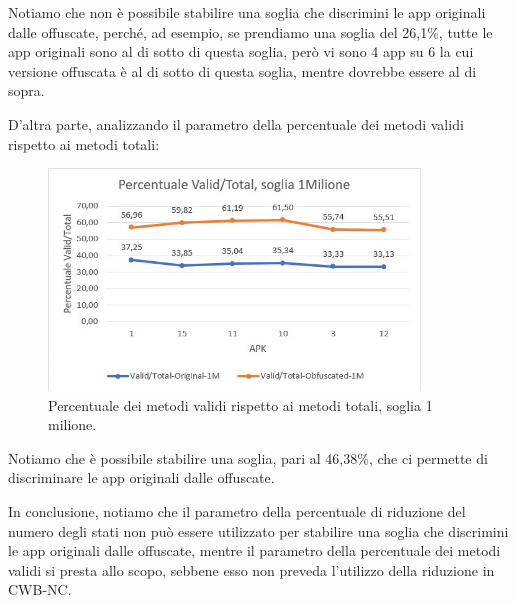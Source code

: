 Notiamo che non è possibile stabilire una soglia che discrimini le app originali dalle offuscate, perché, ad esempio, se prendiamo una soglia del 26,1\%, tutte le app originali sono al di sotto di questa soglia, però vi sono 4 app su 6 la cui versione offuscata è al di sotto di questa soglia, mentre dovrebbe essere al di sopra.

D'altra parte, analizzando il parametro della percentuale dei metodi validi rispetto ai metodi totali:

\begin{figure}[H]
\centering
\includegraphics[width=0.88\textwidth]{img/risultati/metodi_1M.jpg}
\caption{Percentuale dei metodi validi rispetto ai metodi totali, soglia 1 milione.}
\label{fig:percentuale_metodi_validi}
\end{figure}

\noindent Notiamo che è possibile stabilire una soglia, pari al 46,38\%, che ci permette di discriminare le app originali dalle offuscate.

In conclusione, notiamo che il parametro della percentuale di riduzione del numero degli stati non può essere utilizzato per stabilire una soglia che discrimini le app originali dalle offuscate, mentre il parametro della percentuale dei metodi validi si presta allo scopo, sebbene esso non preveda l'utilizzo della riduzione in CWB-NC.